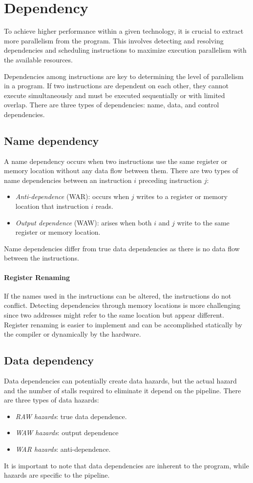 \section{Dependency}

To achieve higher performance within a given technology, it is crucial to extract more parallelism from the program. 
This involves detecting and resolving dependencies and scheduling instructions to maximize execution parallelism with the available resources.

Dependencies among instructions are key to determining the level of parallelism in a program. 
If two instructions are dependent on each other, they cannot execute simultaneously and must be executed sequentially or with limited overlap. 
There are three types of dependencies: name, data, and control dependencies.

\subsection{Name dependency}
A name dependency occurs when two instructions use the same register or memory location without any data flow between them.
There are two types of name dependencies between an instruction $i$ preceding instruction $j$:
\begin{itemize}
    \item \textit{Anti-dependence} (WAR): occurs when $j$ writes to a register or memory location that instruction $i$ reads. 
    \item \textit{Output dependence} (WAW): arises when both $i$ and $j$ write to the same register or memory location. 
\end{itemize}
Name dependencies differ from true data dependencies as there is no data flow between the instructions.

\paragraph*{Register Renaming}
If the names used in the instructions can be altered, the instructions do not conflict. 
Detecting dependencies through memory locations is more challenging since two addresses might refer to the same location but appear different. 
Register renaming is easier to implement and can be accomplished statically by the compiler or dynamically by the hardware.

\subsection{Data dependency}
Data dependencies can potentially create data hazards, but the actual hazard and the number of stalls required to eliminate it depend on the pipeline. 
There are three types of data hazards:
\begin{itemize}
    \item \textit{RAW hazards}: true data dependence.
    \item \textit{WAW hazards}: output dependence
    \item \textit{WAR hazards}: anti-dependence.
\end{itemize}
It is important to note that data dependencies are inherent to the program, while hazards are specific to the pipeline.

